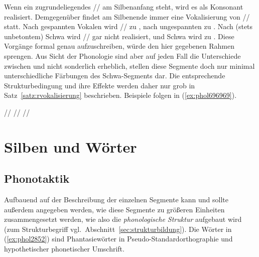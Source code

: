 Wenn ein zugrundeliegendes // am Silbenanfang steht, wird es als Konsonant \textipa{[K]} realisiert.
Demgegenüber findet am Silbenende immer eine Vokalisierung von // statt.
Nach gespannten Vokalen wird // zu \textipa{[5]}, nach ungespannten zu \textipa{[@]}.
Nach (stets unbetontem) Schwa wird // gar nicht realisiert, und Schwa wird zu \textipa{[5]}.
Diese Vorgänge formal genau aufzuschreiben, würde den hier gegebenen Rahmen sprengen.
Aus Sicht der Phonologie sind aber auf jeden Fall die Unterschiede zwischen \textipa{[@]} und \textipa{[5]} nicht sonderlich erheblich, stellen diese Segmente doch nur minimal unterschiedliche Färbungen des Schwa-Segments dar.
Die entsprechende Strukturbedingung und ihre Effekte werden daher nur grob in Satz~\ref{satz:rvokalisierung} beschrieben.
Beispiele folgen in (\ref{ex:phol696969}).


\begin{exe}
  \ex \label{ex:phol696969}
  \begin{xlist}
  	\ex // \phopro \textipa{[kl\t{aE}.n5]}
  	\ex // \phopro \textipa{[t\t{i5}]}
  	\ex // \phopro \textipa{[b\t{I@}.k@]}
  \end{xlist}
\end{exe}


\section{Silben und Wörter}

\label{sec:silbenundwoerter}

\subsection{Phonotaktik}

Aufbauend auf der Beschreibung der einzelnen Segmente kann und sollte außerdem angegeben werden, wie diese Segmente zu größeren Einheiten zusammengesetzt werden, wie also die \textit{phonologische Struktur} aufgebaut wird (zum Strukturbegriff vgl.\ Abschnitt~\ref{sec:strukturbildung}).
Die Wörter in (\ref{ex:phol2852}) sind Phantasiewörter in Pseudo-Standardorthographie und hypothetischer phonetischer Umschrift.

\begin{exe}
  \ex\label{ex:phol2852}
  \begin{xlist}
  \end{xlist}
\end{exe}

